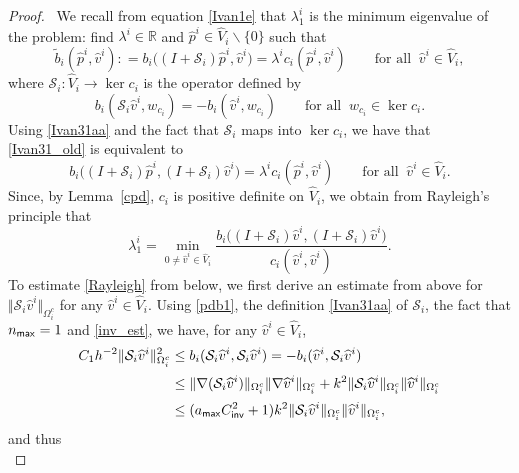\documentclass[numbers,webpdf,imaiai]{ima-authoring-template}%
\theoremstyle{thmstyletwo}%
\numberwithin{equation}{section}
\newcommand{\scS}{\mathcal{S}}
\newcommand{\whV}{\widehat{V}}
\newcommand{\whv}{\widehat{v}}
\newcommand{\whp}{\widehat{p}}
\newcommand{\Cinvt}{C^2_{\textup{\textsf{inv}}}}
\newcommand{\assign}{\mathrel{\mathop:}=}
\numberwithin{equation}{section}
\newcommand{\amax}{a_{\textup{\textsf{max}}}}
\newcommand{\nmax}{n_{\textup{\textsf{max}}}}
\begin{document}
{\begin{proof}\,
We recall from equation \eqref{Ivan1e} that $\lambda_1^i$ is the minimum eigenvalue of the problem:
find $\lambda^i \in \mathbb{R}$ and $\whp^i \in \whV_i\backslash \{0\}$ such that
\begin{equation} \label{Ivan31_old} 
	\widetilde{b}_i (\whp^i, \whv^i) \assign b_i\bigl((I + \scS_i ) \whp^i, \whv^i\bigr) 
	= \lambda^i c_i(\whp^i, \whv^i) \qquad \text{for all} \;\;  \whv^i\in \whV_i,  
\end{equation}
where $\scS_i: \whV_i \rightarrow \ker c_i$ is the operator defined by
\begin{equation} \label{Ivan31aa}  
	b_i(\scS_i \whv^i, {w_{c_i}}) = - b_i(\whv^i, {w_{c_i}}) \qquad \text{for all} \;\; {w_{c_i}} \in \ker c_i.
\end{equation}
Using \eqref{Ivan31aa} and the fact that $\scS_i$ maps into $\ker c_i$, we have that \eqref{Ivan31_old} is equivalent to
\begin{equation} \label{Ivan31} 
	b_i\bigl((I + \scS_i ) \whp^i, (I + \scS_i) \whv^i\bigr)
	= \lambda^i c_i(\whp^i, \whv^i) \qquad \text{for all} \;\; \whv^i\in \whV_i.
\end{equation}
Since, by Lemma~\ref{cpd}, $c_i$ is positive definite on $\whV_i$, we obtain from Rayleigh's principle that
\begin{equation} \label{Rayleigh} 
	\lambda_1^i 
	= \min_{0 \ne {\whv^i} \in \whV_i}\frac{{b_i\bigl((I + \scS_i ) \whv^i, (I + \scS_i) \whv^i\bigr)}}{c_{i} (\whv^i,\whv^i)}.
\end{equation} 
To estimate \eqref{Rayleigh} from below, we first derive an estimate from above for $\Vert \scS_i\whv^i \Vert_{\Omega_i^c}$ 
for any $ \whv^i \in \whV_i$.  Using \eqref{pdb1}, the definition \eqref{Ivan31aa} of $\scS_i$, 
the fact that $\nmax = 1$ and \eqref{inv_est}, we have, 
for any $\whv^i \in \whV_i$,     
\begin{align}
	C_1 h^{-2} \Vert \scS_i \whv^i  \Vert_{\Omega_i^c}^2 
	&\le b_i(\scS_i \whv^i ,\scS_i \whv^i ) 
	= -b_i(\whv^i ,\scS_i \whv^i ) 
	\nonumber \\[0.5ex]
	&\le \Vert \nabla(\scS_i \whv^i  )\Vert_{\Omega_i^c} \Vert \nabla \whv^i \Vert_{\Omega_i^c} 
	+ k^2 \Vert \scS_i  \whv^i \Vert_{\Omega_i^c} \Vert   \whv^i \Vert_{\Omega_i^c} 
	\nonumber \\[0.5ex]
	& \le (\amax\Cinvt + 1)k^2 \Vert \scS_i \whv^i \Vert_{\Omega_i^c} \Vert  \whv^i  \Vert_{\Omega_i^c}, 
	\label{Ivan31a}
\end{align} 
and thus
\begin{equation} \label{Ivan32} 

\end{equation}
\end{proof}}
\end{document}
